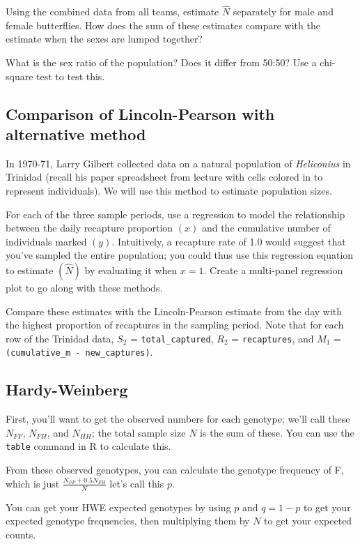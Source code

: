 \documentclass[]{book}
\begin{document}
Using the combined data from all teams, estimate \(\hat{N}\) separately
for male and female butterflies. How does the sum of these estimates
compare with the estimate when the sexes are lumped together?

What is the sex ratio of the population? Does it differ from 50:50? Use
a chi-square test to test this.

\subsection{Comparison of Lincoln-Pearson with alternative
method}\label{comparison-of-lincoln-pearson-with-alternative-method}

In 1970-71, Larry Gilbert collected data on a natural population of
\emph{Heliconius} in Trinidad (recall his paper spreadsheet from lecture
with cells colored in to represent individuals). We will use this method
to estimate population sizes.

For each of the three sample periods, use a regression to model the
relationship between the daily recapture proportion \((x)\) and the
cumulative number of individuals marked \((y)\). Intuitively, a
recapture rate of 1.0 would suggest that you've sampled the entire
population; you could thus use this regression equation to estimate
\((\hat{N})\) by evaluating it when \(x=1\). Create a multi-panel
regression plot to go along with these methods.

Compare these estimates with the Lincoln-Pearson estimate from the day
with the highest proportion of recaptures in the sampling period. Note
that for each row of the Trinidad data, \(S_2\) =
\texttt{total\_captured}, \(R_2\) = \texttt{recaptures}, and \(M_1\) =
\texttt{(cumulative\_m\ -\ new\_captures)}.

\subsection{Hardy-Weinberg}\label{hardy-weinberg}

First, you'll want to get the observed numbers for each genotype; we'll
call these \(N_{FF}\), \(N_{FH}\), and \(N_{HH}\); the total sample size
\(N\) is the sum of these. You can use the \texttt{table} command in R
to calculate this.

From these observed genotypes, you can calculate the genotype frequency
of F, which is just \(\frac{N_{FF} + 0.5 N_{FH} }{N}\) let's call this
\(p\).

You can get your HWE expected genotypes by using \(p\) and \(q=1-p\) to
get your expected genotype frequencies, then multiplying them by \(N\)
to get your expected counts.
\end{document}

